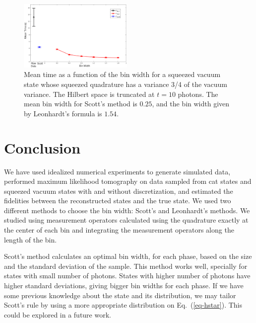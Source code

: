 \documentclass[
reprint,
superscriptaddress,
showpacs,
amsmath,
amssymb,
aps,
pra,
longbibliography
]{revtex4-1}
\begin{document}
\begin{figure}
  \includegraphics[width=0.49\textwidth]{time-vacuocomprimido.eps}
  \caption{Mean time as a function of the bin width for a squeezed
    vacuum state whose squeezed quadrature has a variance 3/4 of the
    vacuum variance. The Hilbert space is truncated at $t=10$ photons. The
    mean bin width for Scott's method is $0.25$, and the bin width
    given by Leonhardt's formula is $1.54$.}
  \label{fig-time-squeezed}
\end{figure}



\section{Conclusion}
\label{conclusion}

We have used idealized numerical experiments to generate simulated
data, performed maximum likelihood tomography on data sampled
from cat states and squeezed vacuum states with and without
discretization, and estimated the fidelities between
the reconstructed states and the true state. We used two different
methods to choose the bin width: Scott's and Leonhardt's methods. We
studied using measurement operators calculated using the
quadrature exactly at the center of each bin and integrating the
measurement operators along the length of the bin. 

Scott's method calculates an optimal bin width, for each phase, based
on the size and the standard deviation of the sample. This method
works well, specially for states with small number of photons.
States with higher number of photons have higher standard deviations, 
giving bigger bin widths for each phase. If we have some previous knowledge
about the state and its distribution, we may tailor Scott's rule
by using a more appropriate distribution on Eq.~(\ref{eq-hstar}).
This could be explored in a future work.
\end{document}
